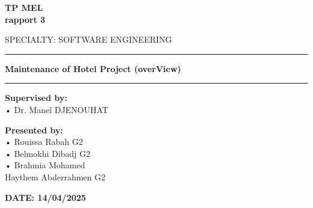 \documentclass[12pt,a4paper]{article}
\begin{document}
\begin{titlepage}
\begin{minipage}{0.15\textwidth}
    \end{minipage}
    
    \vspace{3cm}

    \begin{center}
        \LARGE{\textbf{TP MEL \\ rapport 3}}
    \end{center}

    \vspace{0.1cm}

    \begin{center}
        SPECIALTY: SOFTWARE ENGINEERING
    \end{center}
    
    \vspace{1.9cm}
    \hrule
    \vspace{0.5cm}

    \begin{center}
        \LARGE{\textbf{Maintenance of Hotel Project (overView)}}
    \end{center}
    
    \vspace{0.5cm}
    \hrule
    \vspace{2cm}
    
    \begin{minipage}[t]{0.66\textwidth}
        \textbf{Supervised by:}\\
        • Dr. Manel DJENOUHAT
    \end{minipage}
    \hfill
    \begin{minipage}[t]{0.4\textwidth}
        \textbf{Presented by:}\\
        • Rouissa Rabah G2\\
        • Belmokhi Dibadj G2\\
        • Brahmia Mohamed\\Haythem Abderrahmen G2
    \end{minipage}

    \vspace{5cm}

    \begin{center}
        \large\textbf{DATE: 14/04/2025}
    \end{center}
\end{titlepage}

\thispagestyle{empty}
\tableofcontents
\newpage
\thispagestyle{empty}
\listoftables
\newpage
\thispagestyle{empty}
\listoffigures
\newpage
{}
\end{document}
